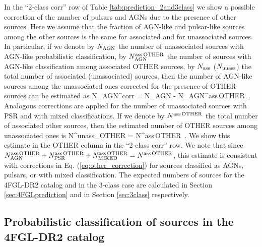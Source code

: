 In the ``2-class corr'' row of Table \ref{tab:prediction_2and3class}
we show a possible correction of the number of pulsars and AGNs due to the presence of other sources.
Here we assume that the fraction of AGN-like and pulsar-like sources among the other sources is the same for associated and for unassociated sources.
In particular, if we denote by $N_{\rm AGN}$ the number of unassociated sources with AGN-like probabilistic classification,
by $N_{\rm AGN}^{\rm ass\,OTHER}$ the number of sources with AGN-like classification among associated OTHER sources,
by $N_{\rm ass}$ ($N_{\rm unass}$) the total number of associated (unassociated) sources, then
the number of AGN-like sources among the unassociated ones corrected for the presence of OTHER sources can be estimated as
\bea
{}
N_{\rm AGN}^{\rm corr} = N_{\rm AGN} - N_{\rm AGN}^{\rm ass\,OTHER} \,.
\eea
Analogous corrections are applied for the number of unassociated sources with PSR and with mixed classifications.
If we denote by $N^{\rm ass\,OTHER}$ the total number of associated other sources, then the estimated number of 
OTHER sources among unassociated ones is
\bea
{}
N^{\rm unass}_{\rm OTHER} = N^{\rm ass\,OTHER} \,.
\eea
We show this estimate in the OTHER column in the ``2-class corr'' row.
We note that since 
$N_{\rm AGN}^{\rm ass\,OTHER} + N_{\rm PSR}^{\rm ass\,OTHER} + N_{\rm MIXED}^{\rm ass\,OTHER} = N^{\rm ass\,OTHER}$,
this estimate is consistent with corrections in Eq. (\ref{eq:other_correction}) for sources classified as AGNs, pulsars, or with mixed classification.
The expected numbers of sources for the 4FGL-DR2 catalog and in the 3-class case are calculated in Section \ref{sec:4FGLprediction}
and in Section \ref{sec:3class} respectively.




\subsection{Probabilistic classification of sources in the 4FGL-DR2 catalog}

